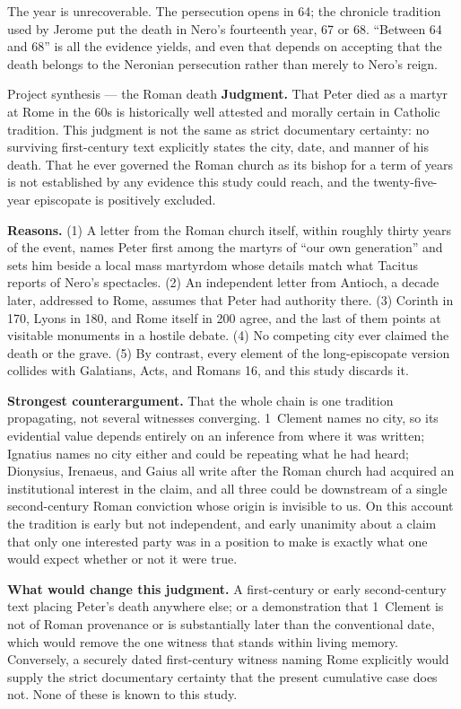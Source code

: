 The year is unrecoverable. The persecution opens in 64; the chronicle
tradition used by Jerome put the death in Nero's fourteenth year, 67 or 68.
``Between 64 and 68'' is all the evidence yields, and even that depends on
accepting that the death belongs to the Neronian persecution rather than
merely to Nero's reign.

\begin{studybox}{Project synthesis --- the Roman death}
\textbf{Judgment.} That Peter died as a martyr at Rome in the 60s is
historically well attested and morally certain in Catholic tradition. This
judgment is not the same as strict documentary certainty: no surviving
first-century text explicitly states the city, date, and manner of his death.
That he ever governed the Roman church as its bishop for a term of years is
not established by any evidence this study could reach, and the
twenty-five-year episcopate is positively excluded.

\textbf{Reasons.} (1) A letter from the Roman church itself, within roughly
thirty years of the event, names Peter first among the martyrs of ``our own
generation'' and sets him beside a local mass martyrdom whose details match
what Tacitus reports of Nero's spectacles. (2) An independent letter from
Antioch, a decade later, addressed to Rome, assumes that Peter had authority
there. (3) Corinth in 170, Lyons in 180, and Rome itself in 200 agree, and
the last of them points at visitable monuments in a hostile debate. (4) No
competing city ever claimed the death or the grave. (5) By contrast, every
element of the long-episcopate version collides with Galatians, Acts, and
Romans 16, and this study discards it.

\textbf{Strongest counterargument.} That the whole chain is one tradition
propagating, not several witnesses converging. 1~Clement names no city, so
its evidential value depends entirely on an inference from where it was
written; Ignatius names no city either and could be repeating what he had
heard; Dionysius, Irenaeus, and Gaius all write after the Roman church had
acquired an institutional interest in the claim, and all three could be
downstream of a single second-century Roman conviction whose origin is
invisible to us. On this account the tradition is early but not independent,
and early unanimity about a claim that only one interested party was in a
position to make is exactly what one would expect whether or not it were
true.

\textbf{What would change this judgment.} A first-century or early
second-century text placing Peter's death anywhere else; or a demonstration
that 1~Clement is not of Roman provenance or is substantially later than the
conventional date, which would remove the one witness that stands within
living memory. Conversely, a securely dated first-century witness naming Rome
explicitly would supply the strict documentary certainty that the present
cumulative case does not. None of these is known to this study.
\end{studybox}
